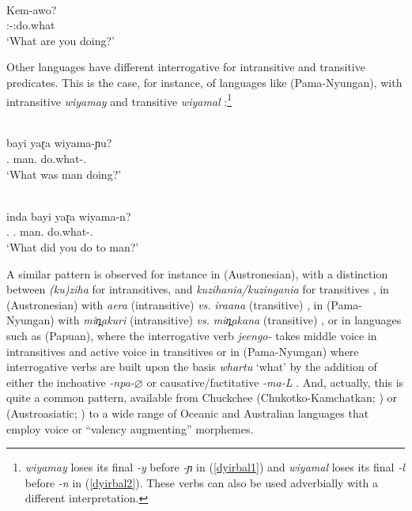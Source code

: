 \documentclass[output=paper]{langsci/langscibook}
\begin{document}
\begin{exe}
\ex \label{erro} \\
\gll Kem-awo?\\
\Ssg:\Prs-\Mr{}:do.what\\
\glt `What are you doing?'
\end{exe}


Other languages have different interrogative  for intransitive and
transitive predicates. This is the case, for instance, of languages like
 (Pama-Nyungan), with  intransitive \emph{wiyamay} and transitive
\emph{wiyamal} \citep[55]{Dixon1972}:\footnote{\emph{wiyamay} loses its final
\emph{-y} before \emph{-ɲ} in (\ref{dyirbal1}) and \emph{wiyamal}
loses its final \emph{-l} before \emph{-n} in (\ref{dyirbal2}). These verbs can
also be used adverbially with a different interpretation.}

\begin{exe}
\label{dyirbal}
\ex \label{dyirbal1} \\
\gll bayi yaɽa wiyama-ɲu?\\
\Cl.\Nom{} man.\Nom{} do.what-\Ut{}.\Intr{}\\
\glt `What was man doing?'

\ex \label{dyirbal2} \\
\gll \ng inda bayi yaɽa wiyama-n?\\
\Ssg.\Erg{} \Cl.\Nom{} man.\Nom{} do.what-\Ut{}.\Tr{}\\
\glt `What did you do to man?'
\end{exe}

A similar pattern is observed for instance in  (Austronesian), with a
distinction between \emph{(ku)ziha} for intransitives, and
\emph{kuzihania/kuzingania} for transitives \citep{vandenberg.bachet2006}, in
 (Austronesian) with \emph{aera} (intransitive) \emph{vs.}
\emph{iraana} (transitive) \parencite[82]{grovesetal1985}, in 
(Pama-Nyungan) with \emph{min̪akuri} (intransitive) \emph{vs.}
\emph{min̪akana} (transitive) \citep{blake1979}, or in languages
such as  (Papuan), where the interrogative verb \emph{jeengo-}
takes middle voice in intransitives and active voice in transitives
\citep{onishi1994} or in  (Pama-Nyungan) where interrogative
verbs are built upon the basis \emph{whartu} ‘what’  by the addition of either
the inchoative \emph{-npa-$\varnothing$} or causative/factitative \emph{-ma-L}
\citep{dench1994}. And, actually, this is quite a common pattern, available
from Chuckchee (Chukotko-Kamchatkan; \citealt{spencer1999,dunn1999})
or  (Austroasiatic; \citealt{peterson2010}) to a wide range of
Oceanic and Australian languages that employ voice or ``valency augmenting''
morphemes.\largerpage
\end{document}
